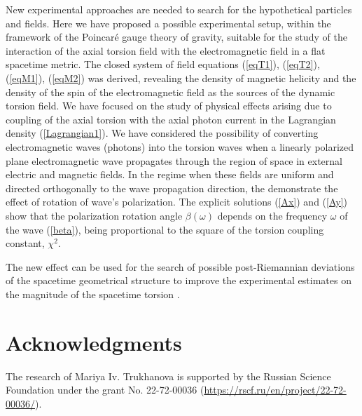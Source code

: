 \documentclass[12pt,prd,showkeys,amsmath,amssymb,nofootinbib]{revtex4-1}
\begin{document}
New experimental approaches are needed to search for the hypothetical particles and fields. Here we have proposed a possible experimental setup, within the framework of the Poincar\'e gauge theory of gravity, suitable for the study of the interaction of the axial torsion field with the electromagnetic field in a flat spacetime metric. The closed system of field equations (\ref{eqT1}), (\ref{eqT2}), (\ref{eqM1}), (\ref{eqM2}) was derived, revealing the density of magnetic helicity and the density of the spin of the electromagnetic field as the sources of the dynamic torsion field. We have focused on the study of physical effects arising due to coupling of the axial torsion with the axial photon current in the Lagrangian density (\ref{Lagrangian1}). We have considered the possibility of converting electromagnetic waves (photons) into the torsion waves when a linearly polarized plane electromagnetic wave propagates through the region of space in external electric and magnetic fields. In the regime when these fields are uniform and directed orthogonally to the wave propagation direction, the demonstrate the effect of rotation of wave's polarization. The explicit solutions (\ref{Ax}) and (\ref{Ay}) show that the polarization rotation angle $\beta(\omega)$ depends on the frequency $\omega$ of the wave (\ref{beta}), being proportional to the square of the torsion coupling constant, $\chi^2$. 

The new effect can be used for the search of possible post-Riemannian deviations of the spacetime geometrical structure to improve the experimental estimates on the magnitude of the spacetime torsion \cite{Lamm,Alan,PhysRevD.90.124068,TAO}.

\section*{Acknowledgments}

The research of Mariya Iv. Trukhanova is supported by the Russian Science Foundation under the grant No. 22-72-00036 (\url{https://rscf.ru/en/project/22-72-00036/}).
\end{document}
